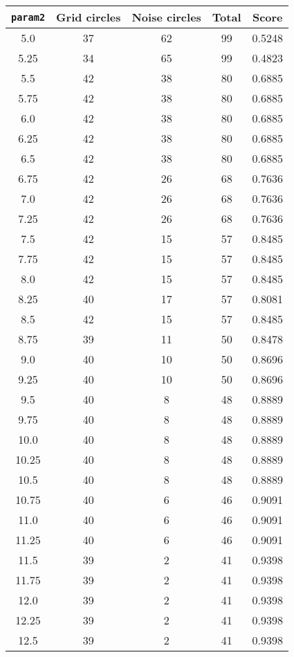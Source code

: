 \documentclass[letterpaper, 12pt]{article}
\begin{document}
\begin{longtable}{|c|c|c|c|c|}
\hline
\textbf{\texttt{param2}} & \textbf{Grid circles} & \textbf{Noise circles} & \textbf{Total} & \textbf{Score} \\
\hline
5.0 & 37 & 62 & 99 & 0.5248 \\
\hline
5.25 & 34 & 65 & 99 & 0.4823 \\
\hline
5.5 & 42 & 38 & 80 & 0.6885 \\
\hline
5.75 & 42 & 38 & 80 & 0.6885 \\
\hline
6.0 & 42 & 38 & 80 & 0.6885 \\
\hline
6.25 & 42 & 38 & 80 & 0.6885 \\
\hline
6.5 & 42 & 38 & 80 & 0.6885 \\
\hline
6.75 & 42 & 26 & 68 & 0.7636 \\
\hline
7.0 & 42 & 26 & 68 & 0.7636 \\
\hline
7.25 & 42 & 26 & 68 & 0.7636 \\
\hline
7.5 & 42 & 15 & 57 & 0.8485 \\
\hline
7.75 & 42 & 15 & 57 & 0.8485 \\
\hline
8.0 & 42 & 15 & 57 & 0.8485 \\
\hline
8.25 & 40 & 17 & 57 & 0.8081 \\
\hline
8.5 & 42 & 15 & 57 & 0.8485 \\
\hline
8.75 & 39 & 11 & 50 & 0.8478 \\
\hline
9.0 & 40 & 10 & 50 & 0.8696 \\
\hline
9.25 & 40 & 10 & 50 & 0.8696 \\
\hline
9.5 & 40 & 8 & 48 & 0.8889 \\
\hline
9.75 & 40 & 8 & 48 & 0.8889 \\
\hline
10.0 & 40 & 8 & 48 & 0.8889 \\
\hline
10.25 & 40 & 8 & 48 & 0.8889 \\
\hline
10.5 & 40 & 8 & 48 & 0.8889 \\
\hline
10.75 & 40 & 6 & 46 & 0.9091 \\
\hline
11.0 & 40 & 6 & 46 & 0.9091 \\
\hline
11.25 & 40 & 6 & 46 & 0.9091 \\
\hline
11.5 & 39 & 2 & 41 & 0.9398 \\
\hline
11.75 & 39 & 2 & 41 & 0.9398 \\
\hline
12.0 & 39 & 2 & 41 & 0.9398 \\
\hline
12.25 & 39 & 2 & 41 & 0.9398 \\
\hline
12.5 & 39 & 2 & 41 & 0.9398 \\

\end{longtable}
\end{document}
